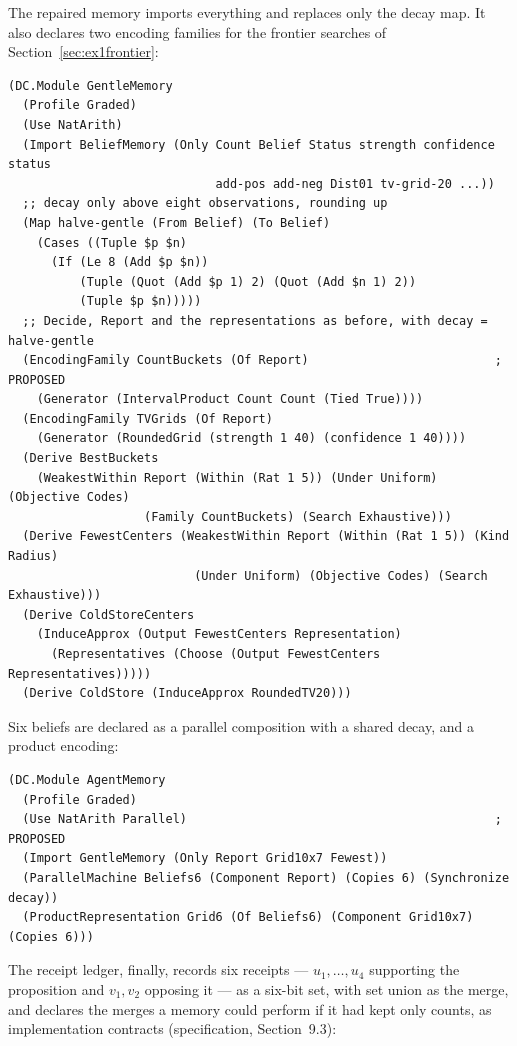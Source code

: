 \documentclass[11pt]{article}
\newcommand{\spec}[1]{specification, Section~#1}
\theoremstyle{definition}
\theoremstyle{plain}
\begin{document}
The repaired memory imports everything and replaces only the decay map. It also declares two
encoding families for the frontier searches of Section~\ref{sec:ex1frontier}:
\begin{lstlisting}
(DC.Module GentleMemory
  (Profile Graded)
  (Use NatArith)
  (Import BeliefMemory (Only Count Belief Status strength confidence status
                             add-pos add-neg Dist01 tv-grid-20 ...))
  ;; decay only above eight observations, rounding up
  (Map halve-gentle (From Belief) (To Belief)
    (Cases ((Tuple $p $n)
      (If (Le 8 (Add $p $n))
          (Tuple (Quot (Add $p 1) 2) (Quot (Add $n 1) 2))
          (Tuple $p $n)))))
  ;; Decide, Report and the representations as before, with decay = halve-gentle
  (EncodingFamily CountBuckets (Of Report)                          ; PROPOSED
    (Generator (IntervalProduct Count Count (Tied True))))
  (EncodingFamily TVGrids (Of Report)
    (Generator (RoundedGrid (strength 1 40) (confidence 1 40))))
  (Derive BestBuckets
    (WeakestWithin Report (Within (Rat 1 5)) (Under Uniform) (Objective Codes)
                   (Family CountBuckets) (Search Exhaustive)))
  (Derive FewestCenters (WeakestWithin Report (Within (Rat 1 5)) (Kind Radius)
                          (Under Uniform) (Objective Codes) (Search Exhaustive)))
  (Derive ColdStoreCenters
    (InduceApprox (Output FewestCenters Representation)
      (Representatives (Choose (Output FewestCenters Representatives)))))
  (Derive ColdStore (InduceApprox RoundedTV20)))
\end{lstlisting}
Six beliefs are declared as a parallel composition with a shared decay, and a product encoding:
\begin{lstlisting}
(DC.Module AgentMemory
  (Profile Graded)
  (Use NatArith Parallel)                                           ; PROPOSED
  (Import GentleMemory (Only Report Grid10x7 Fewest))
  (ParallelMachine Beliefs6 (Component Report) (Copies 6) (Synchronize decay))
  (ProductRepresentation Grid6 (Of Beliefs6) (Component Grid10x7) (Copies 6)))
\end{lstlisting}
The receipt ledger, finally, records six receipts --- $u_1,\dots,u_4$ supporting the proposition and
$v_1,v_2$ opposing it --- as a six-bit set, with set union as the merge, and declares the merges a
memory could perform if it had kept only counts, as implementation contracts (\spec{9.3}):
\end{document}
